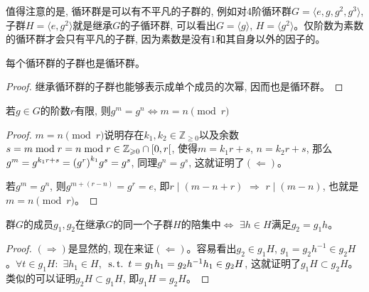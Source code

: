 \par 值得注意的是, 循环群是可以有不平凡的子群的, 例如对4阶循环群$G=\langle e,g,g^2,g^3\rangle$, 子群$H=\langle e,g^2\rangle$就是继承$G$的子循环群, 可以看出$G=\langle g\rangle$, $H=\langle g^2\rangle$。仅阶数为素数的循环群才会只有平凡的子群, 因为素数是没有$1$和其自身以外的因子的。
\begin{exercise}[教材B.7]
    每个循环群的子群也是循环群。
\end{exercise}
\begin{proof}
    继承循环群的子群也能够表示成单个成员的次幂, 因而也是循环群。
\end{proof}
\begin{exercise}[教材B.8]
    若$g\in G$的阶数$r$有限, 则$g^m=g^n\Longleftrightarrow m=n\pmod r$
\end{exercise}
\begin{proof}
    $m=n\pmod r$说明存在$k_1,k_2\in\mathbb{Z}_{\geq 0}$以及余数$s=m\bmod r=n\bmod r\in\mathbb{Z}_{\geqslant 0}\cap\mathop{\left[0,r\right[}$, 使得$m=k_1r+s$, $n=k_2r+s$, 那么$g^m=g^{k_1r+s}=\qty(g^r)^{k_1}g^s=g^s$, 同理$g^n=g^s$, 这就证明了$(\Longleftarrow)$。
    \par 若$g^m=g^n$, 则$g^{m+(r-n)}=g^r=e$, 即$r\mid (m-n+r)$ $\Longrightarrow$ $r\mid (m-n)$, 也就是$m=n\pmod r$。
\end{proof}
\begin{exercise}[教材B.9]
    群$G$的成员$g_1,g_2$在继承$G$的同一个子群$H$的陪集中$\Longleftrightarrow$ $\exists h\in H$满足$g_2=g_1h$。
\end{exercise}
\begin{proof}
    $(\Longrightarrow)$是显然的, 现在来证$(\Longleftarrow)$。容易看出$g_2\in g_1H$, $g_1=g_2h^{-1}\in g_2H$。$\forall t\in g_1H:$ $\exists h_1\in H$, $\operatorname{{\rm \ s.t.\ }} t=g_1h_1=g_2h^{-1}h_1\in g_2H$, 这就证明了$g_1H\subset g_2H$。类似的可以证明$g_2H\subset g_1H$, 即$g_1H=g_2H$。
\end{proof}

